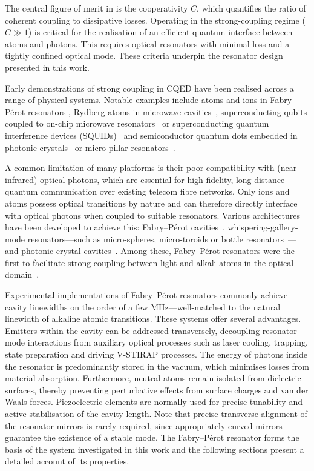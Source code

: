 \documentclass[../Thesis-IJspeert.tex]{subfiles}
\begin{document}
The central figure of merit in is the cooperativity $C$, which quantifies the ratio of coherent coupling to dissipative losses. Operating in the strong-coupling regime ($C\gg1$) is critical for the realisation of an efficient quantum interface between atoms and photons. This requires optical resonators with minimal loss and a tightly confined optical mode. These criteria underpin the resonator design presented in this work.

Early demonstrations of strong coupling in CQED have been realised across a range of physical systems. Notable examples include atoms and ions in Fabry--Pérot resonators \cite{Thompson1992,Hiroki2020}, Rydberg atoms in microwave cavities~\cite{Brune1996}, superconducting qubits coupled to on-chip microwave resonators~\cite{Wallraff2004} or superconducting quantum interference devices (SQUIDs)~\cite{Chiorescu2004} and semiconductor quantum dots embedded in photonic crystals~\cite{Yoshie2004} or micro-pillar resonators~\cite{Reithmaier2004}.

A common limitation of many platforms is their poor compatibility with (near-infrared) optical photons, which are essential for high-fidelity, long-distance quantum communication over existing telecom fibre networks. Only ions and atoms possess optical transitions by nature and can therefore directly interface with optical photons when coupled to suitable resonators. Various architectures have been developed to achieve this: Fabry--Pérot cavities~\cite{Thompson1992}, whispering-gallery-mode resonators---such as micro-spheres, micro-toroids or bottle resonators~\cite{Vahala2003}---and photonic crystal cavities~\cite{Thompson2013}. Among these, Fabry--Pérot resonators were the first to facilitate strong coupling between light and alkali atoms in the optical domain~\cite{Thompson1992}.

Experimental implementations of Fabry--Pérot resonators commonly achieve cavity linewidths on the order of a few \si{\mega\hertz}---well-matched to the natural linewidth of alkaline atomic transitions. These systems offer several advantages. Emitters within the cavity can be addressed transversely, decoupling resonator-mode interactions from auxiliary optical processes such as laser cooling, trapping, state preparation and driving V-STIRAP processes. The energy of photons inside the resonator is predominantly stored in the vacuum, which minimises losses from material absorption. Furthermore, neutral atoms remain isolated from dielectric surfaces, thereby preventing perturbative effects from surface charges and van der Waals forces. Piezoelectric elements are normally used for precise tunability and active stabilisation of the cavity length. Note that precise transverse alignment of the resonator mirrors is rarely required, since appropriately curved mirrors guarantee the existence of a stable mode. The Fabry--Pérot resonator forms the basis of the system investigated in this work and the following sections present a detailed account of its properties.
\end{document}
